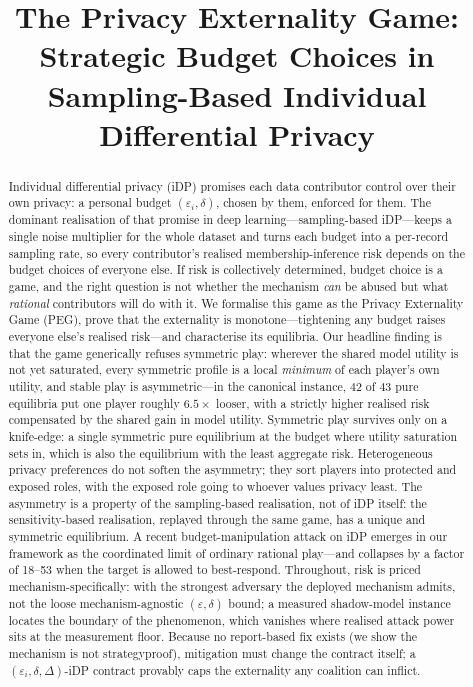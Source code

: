 \documentclass[conference]{IEEEtran}
\title{The Privacy Externality Game:\\
Strategic Budget Choices in Sampling-Based Individual Differential Privacy}
\author{
\IEEEauthorblockN{Anonymous Submission}
}
\theoremstyle{plain}
\theoremstyle{definition}
\theoremstyle{remark}
\newcommand{\eps}{\varepsilon}
\begin{document}
\maketitle

\begin{abstract}
Individual differential privacy (iDP) promises each data contributor
control over their own privacy: a personal budget $(\eps_i, \delta)$,
chosen by them, enforced for them. The dominant realisation of that
promise in deep learning---sampling-based iDP---keeps a single noise
multiplier for the whole dataset and turns each budget into a
per-record sampling rate, so every contributor's realised
membership-inference risk depends on the budget choices of everyone
else. If risk is collectively determined, budget choice is a game, and
the right question is not whether the mechanism \emph{can} be abused
but what \emph{rational} contributors will do with it. We formalise
this game as the Privacy Externality Game (PEG), prove that the
externality is monotone---tightening any budget raises everyone else's
realised risk---and characterise its equilibria. Our headline finding
is that the game generically refuses symmetric play: wherever the
shared model utility is not yet saturated, every symmetric profile
is a local \emph{minimum} of each player's own utility, and stable
play is asymmetric---in the canonical instance, $42$ of $43$ pure
equilibria put one player roughly $6.5\times$ looser, with a
strictly higher realised risk compensated by the shared gain in
model utility. Symmetric play survives only on a knife-edge: a
single symmetric pure equilibrium at the budget where utility
saturation sets in, which is also the equilibrium with the least
aggregate risk. Heterogeneous privacy preferences do not soften the
asymmetry; they sort players into protected and exposed roles, with
the exposed role going to whoever values privacy least. The asymmetry is a
property of the sampling-based realisation, not of iDP itself: the
sensitivity-based realisation, replayed through the same game, has a
unique and symmetric equilibrium. A recent budget-manipulation attack
on iDP emerges in our framework as the coordinated limit of ordinary
rational play---and collapses by a factor of 18--53 when the target is
allowed to best-respond. Throughout, risk is priced
mechanism-specifically: with the strongest adversary the deployed
mechanism admits, not the loose mechanism-agnostic
$(\eps,\delta)$ bound; a measured shadow-model instance locates the
boundary of the phenomenon, which vanishes where realised attack
power sits at the measurement floor.
Because no report-based fix exists (we show
the mechanism is not strategyproof), mitigation must change the
contract itself; a $(\eps_i,\delta,\Delta)$-iDP contract provably caps
the externality any coalition can inflict.
\end{abstract}
\end{document}
